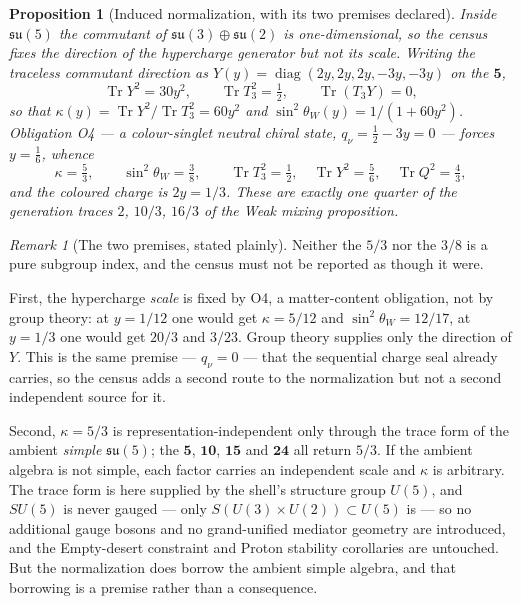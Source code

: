\documentclass[11pt]{article}
\theoremstyle{plain}
\newtheorem{proposition}[theorem]{Proposition}
\theoremstyle{definition}
\theoremstyle{remark}
\newtheorem{remark}[theorem]{Remark}
\newcommand{\Tr}{\operatorname{Tr}}
\begin{document}
\begin{proposition}[Induced normalization, with its two premises declared]
Inside \(\mathfrak{su}(5)\) the commutant of \(\mathfrak{su}(3)\oplus\mathfrak{su}(2)\) is one-dimensional, so the census fixes the \emph{direction} of the hypercharge generator but not its scale. Writing the traceless commutant direction as \(Y(y)=\operatorname{diag}(2y,2y,2y,-3y,-3y)\) on the \(\mathbf5\),
\[
\Tr Y^2=30y^2,
\qquad
\Tr T_3^2=\tfrac12,
\qquad
\Tr(T_3Y)=0,
\]
so that \(\kappa(y)=\Tr Y^2/\Tr T_3^2=60y^2\) and \(\sin^2\theta_W(y)=1/(1+60y^2)\). Obligation O4 --- a colour-singlet neutral chiral state, \(q_\nu=\tfrac12-3y=0\) --- forces \(y=\tfrac16\), whence
\[
\kappa=\tfrac53,
\qquad
\sin^2\theta_W=\tfrac38,
\qquad
\Tr T_3^2=\tfrac12,\quad\Tr Y^2=\tfrac56,\quad\Tr Q^2=\tfrac43,
\]
and the coloured charge is \(2y=1/3\). These are exactly one quarter of the generation traces \(2\), \(10/3\), \(16/3\) of the Weak mixing proposition.
\end{proposition}

\begin{remark}[The two premises, stated plainly]
Neither the \(5/3\) nor the \(3/8\) is a pure subgroup index, and the census must not be reported as though it were.

First, the hypercharge \emph{scale} is fixed by O4, a matter-content obligation, not by group theory: at \(y=1/12\) one would get \(\kappa=5/12\) and \(\sin^2\theta_W=12/17\), at \(y=1/3\) one would get \(20/3\) and \(3/23\). Group theory supplies only the direction of \(Y\). This is the same premise --- \(q_\nu=0\) --- that the sequential charge seal already carries, so the census adds a second route to the normalization but not a second independent source for it.

Second, \(\kappa=5/3\) is representation-independent only through the trace form of the ambient \emph{simple} \(\mathfrak{su}(5)\); the \(\mathbf5\), \(\mathbf{10}\), \(\mathbf{15}\) and \(\mathbf{24}\) all return \(5/3\). If the ambient algebra is not simple, each factor carries an independent scale and \(\kappa\) is arbitrary. The trace form is here supplied by the shell's structure group \(U(5)\), and \(SU(5)\) is never gauged --- only \(S(U(3)\times U(2))\subset U(5)\) is --- so no additional gauge bosons and no grand-unified mediator geometry are introduced, and the Empty-desert constraint and Proton stability corollaries are untouched. But the normalization does borrow the ambient simple algebra, and that borrowing is a premise rather than a consequence.
\end{remark}
\end{document}
